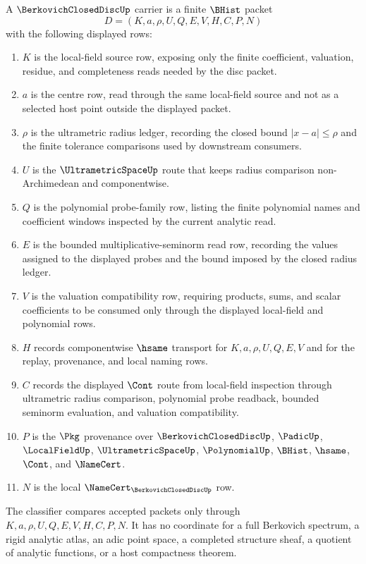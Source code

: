 \begin{definition}
\label{def:berkovich-closed-disc-carrier}
A $\BerkovichClosedDiscUp$ carrier is a finite $\BHist$ packet
$$
D=(K,a,\rho,U,Q,E,V,H,C,P,N)
$$
with the following displayed rows:
\begin{enumerate}
\item $K$ is the local-field source row, exposing only the finite coefficient, valuation, residue, and completeness reads needed by the disc packet.
\item $a$ is the centre row, read through the same local-field source and not as a selected host point outside the displayed packet.
\item $\rho$ is the ultrametric radius ledger, recording the closed bound $|x-a|\leq \rho$ and the finite tolerance comparisons used by downstream consumers.
\item $U$ is the $\UltrametricSpaceUp$ route that keeps radius comparison non-Archimedean and componentwise.
\item $Q$ is the polynomial probe-family row, listing the finite polynomial names and coefficient windows inspected by the current analytic read.
\item $E$ is the bounded multiplicative-seminorm read row, recording the values assigned to the displayed probes and the bound imposed by the closed radius ledger.
\item $V$ is the valuation compatibility row, requiring products, sums, and scalar coefficients to be consumed only through the displayed local-field and polynomial rows.
\item $H$ records componentwise $\hsame$ transport for $K,a,\rho,U,Q,E,V$ and for the replay, provenance, and local naming rows.
\item $C$ records the displayed $\Cont$ route from local-field inspection through ultrametric radius comparison, polynomial probe readback, bounded seminorm evaluation, and valuation compatibility.
\item $P$ is the $\Pkg$ provenance over $\BerkovichClosedDiscUp$, $\PadicUp$, $\LocalFieldUp$, $\UltrametricSpaceUp$, $\PolynomialUp$, $\BHist$, $\hsame$, $\Cont$, and $\NameCert$.
\item $N$ is the local $\NameCert_{\BerkovichClosedDiscUp}$ row.
\end{enumerate}
The classifier compares accepted packets only through $K,a,\rho,U,Q,E,V,H,C,P,N$. It has no coordinate for a full Berkovich spectrum, a rigid analytic atlas, an adic point space, a completed structure sheaf, a quotient of analytic functions, or a host compactness theorem.
\end{definition}

